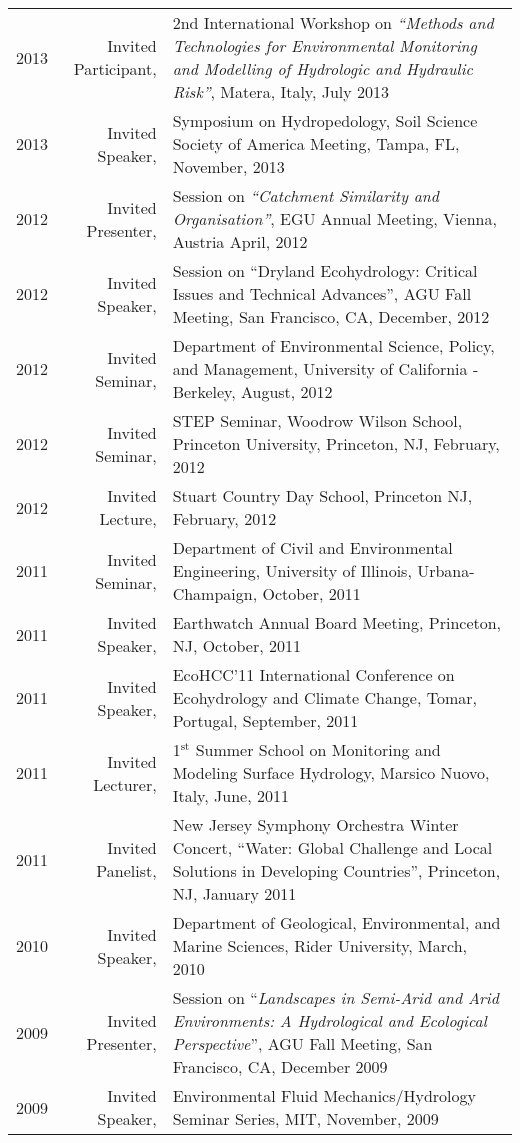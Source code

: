 \documentclass[10pt]{report}
\begin{document}
\begin{longtable}{p{.25in} r p{}}
2013 & Invited Participant, & 2nd International Workshop on \emph{``Methods and Technologies for Environmental Monitoring and Modelling of Hydrologic and Hydraulic Risk''}, Matera, Italy, July 2013 \\
2013 & Invited Speaker, & Symposium on Hydropedology, Soil Science Society of America Meeting, Tampa, FL, November, 2013 \\
2012 & Invited Presenter, &  Session on \emph{``Catchment Similarity and Organisation''}, EGU Annual Meeting, Vienna, Austria April, 2012 \\
2012 & Invited Speaker, & Session on ``Dryland Ecohydrology: Critical Issues and Technical Advances'', AGU Fall Meeting, San Francisco, CA, December, 2012 \\ 
2012 & Invited Seminar, & Department of Environmental Science, Policy, and Management, University of California - Berkeley, August, 2012 \\ 
2012 & Invited Seminar, & STEP Seminar, Woodrow Wilson School, Princeton University, Princeton, NJ, February, 2012 \\
2012 & Invited Lecture, & Stuart Country Day School, Princeton NJ, February, 2012 \\
2011 & Invited Seminar, & Department of Civil and Environmental Engineering, University of Illinois, Urbana-Champaign, October, 2011 \\ 
2011 & Invited Speaker, & Earthwatch Annual Board Meeting, Princeton, NJ, October, 2011 \\
2011 & Invited  Speaker, & EcoHCC'11 International Conference on Ecohydrology and Climate Change, Tomar, Portugal, September, 2011 \\ 
2011 & Invited Lecturer, & 1$^{\mbox{st}}$ Summer School on Monitoring and Modeling Surface Hydrology, Marsico Nuovo, Italy, June, 2011 \\
2011 & Invited Panelist, & New Jersey Symphony Orchestra Winter Concert, ``Water: Global Challenge and Local Solutions in Developing Countries'', Princeton, NJ, January 2011 \\
2010 & Invited Speaker, & Department of Geological, Environmental, and Marine Sciences, Rider University, March, 2010 \\
2009 & Invited Presenter, & Session on ``\emph{Landscapes in Semi-Arid and Arid Environments: A Hydrological and Ecological Perspective}'', AGU Fall Meeting, San Francisco, CA, December 2009 \\ 
2009 & Invited Speaker, & Environmental Fluid Mechanics/Hydrology Seminar Series, MIT, November, 2009 \\

\end{longtable}
\end{document}
